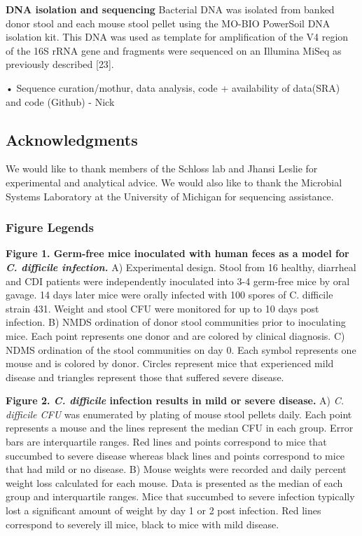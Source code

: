 \documentclass[11pt,]{article}
\begin{document}
\textbf{DNA isolation and sequencing} Bacterial DNA was isolated from
banked donor stool and each mouse stool pellet using the MO-BIO
PowerSoil DNA isolation kit. This DNA was used as template for
amplification of the V4 region of the 16S rRNA gene and fragments were
sequenced on an Illumina MiSeq as previously described {[}23{]}.

• Sequence curation/mothur, data analysis, code + availability of
data(SRA) and code (Github) - Nick

\subsection{Acknowledgments}\label{acknowledgments}

We would like to thank members of the Schloss lab and Jhansi Leslie for
experimental and analytical advice. We would also like to thank the
Microbial Systems Laboratory at the University of Michigan for
sequencing assistance.

\newpage

\subsubsection{Figure Legends}\label{figure-legends}

\textbf{Figure 1. Germ-free mice inoculated with human feces as a model
for \emph{C. difficile infection.}} A) Experimental design. Stool from
16 healthy, diarrheal and CDI patients were independently inoculated
into 3-4 germ-free mice by oral gavage. 14 days later mice were orally
infected with 100 spores of C. difficile strain 431. Weight and stool
CFU were monitored for up to 10 days post infection. B) NMDS ordination
of donor stool communities prior to inoculating mice. Each point
represents one donor and are colored by clinical diagnosis. C) NDMS
ordination of the stool communities on day 0. Each symbol represents one
mouse and is colored by donor. Circles represent mice that experienced
mild disease and triangles represent those that suffered severe disease.

\textbf{Figure 2. \emph{C. difficile} infection results in mild or
severe disease.} A) \emph{C. difficile CFU} was enumerated by plating of
mouse stool pellets daily. Each point represents a mouse and the lines
represent the median CFU in each group. Error bars are interquartile
ranges. Red lines and points correspond to mice that succumbed to severe
disease whereas black lines and points correspond to mice that had mild
or no disease. B) Mouse weights were recorded and daily percent weight
loss calculated for each mouse. Data is presented as the median of each
group and interquartile ranges. Mice that succumbed to severe infection
typically lost a significant amount of weight by day 1 or 2 post
infection. Red lines correspond to severely ill mice, black to mice with
mild disease.
\end{document}
